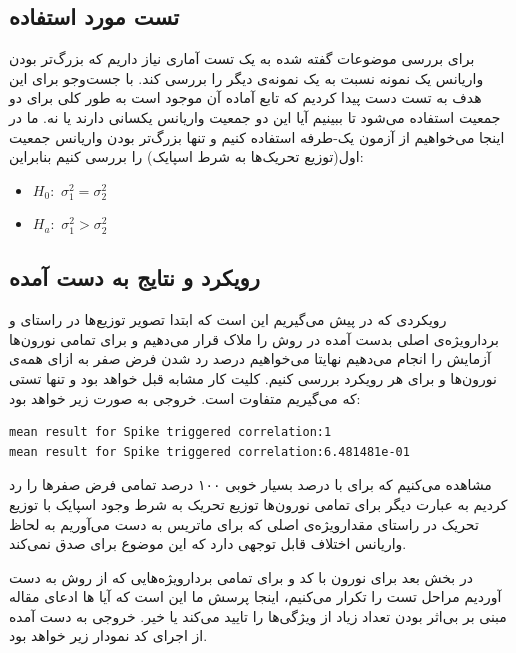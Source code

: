\documentclass[12pt,onecolumn,a4paper,fleqn]{article}
\begin{document}
\subsection{تست مورد استفاده}
برای بررسی موضوعات گفته شده به یک تست آماری نیاز داریم که بزرگ‌تر بودن واریانس یک نمونه‌ نسبت به یک نمونه‌ی دیگر را بررسی کند. با جست‌وجو برای این هدف به تست  دست پیدا کردیم که تابع آماده آن موجود است به طور کلی  برای دو جمعیت استفاده می‌شود تا ببینیم آیا این دو جمعیت واریانس یکسانی دارند یا نه. ما در اینجا می‌خواهیم از آزمون یک-طرفه استفاده کنیم و تنها بزرگ‌تر بودن واریانس جمعیت اول(توزیع‌ تحریک‌ها به شرط اسپایک) را بررسی کنیم بنابراین:

\begin{latin}
\begin{itemize}
	\item 
	$H_0:$ \space $\sigma_1^2 = \sigma_2^2$
	\item 
	$H_a:$ \space
	$\sigma_1^2 > \sigma_2^2$
\end{itemize}
\end{latin}

\subsection{رویکرد و نتایج به دست آمده}
رویکردی که در پیش می‌گیریم این است که ابتدا تصویر توزیع‌ها در راستای‌ 
و بردارویژه‌ی اصلی بدست آمده در روش  را ملاک قرار می‌دهیم و برای تمامی نورون‌ها آزمایش  را انجام می‌دهیم نهایتا می‌خواهیم درصد رد شدن فرض صفر به ازای همه‌ی نورون‌ها و برای هر رویکرد بررسی کنیم. کلیت کار مشابه قبل خواهد بود و تنها تستی که می‌گیریم متفاوت است. خروجی به صورت زیر خواهد بود:

\begin{latin}
	\begin{lstlisting}[basicstyle=\small, frame = single]
mean result for Spike triggered correlation:1
mean result for Spike triggered correlation:6.481481e-01
	\end{lstlisting}
\end{latin}

مشاهده می‌کنیم که برای  با درصد بسیار خوبی ۱۰۰ درصد تمامی فرض صفر‌ها را رد کردیم به عبارت دیگر برای تمامی نورون‌ها توزیع تحریک به شرط وجود اسپایک با توزیع تحریک در راستای‌ مقدارویژه‌ی اصلی که برای ماتریس  به دست می‌آوریم به لحاظ واریانس اختلاف قابل توجهی دارد که این موضوع برای  صدق نمی‌کند.

در بخش بعد برای نورون با کد
 و برای تمامی بردارویژه‌هایی که از روش  به دست آوردیم مراحل تست را تکرار می‌کنیم، اینجا پرسش ما این است که آیا ها ادعای مقاله مبنی بر بی‌اثر بودن تعداد زیاد از ویژگی‌ها را تایید می‌کند یا خیر. خروجی به دست آمده از اجرای کد نمودار زیر خواهد بود.
 
\end{document}
